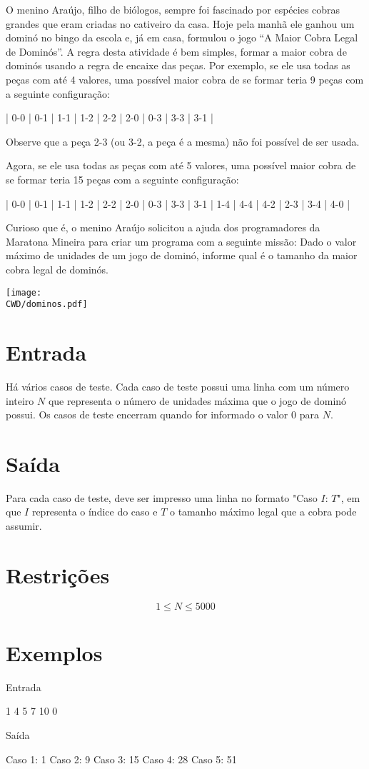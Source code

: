 O menino Araújo, filho de biólogos, sempre foi fascinado por espécies cobras grandes que eram criadas no cativeiro da casa. Hoje pela manhã ele ganhou um dominó no bingo da escola e, já em casa, formulou o jogo ``A Maior Cobra Legal de Dominós''. A regra desta atividade é bem simples, formar a maior cobra de dominós usando a regra de encaixe das peças. Por exemplo, se ele usa todas as peças com até 4 valores, uma possível maior cobra de se formar teria 9 peças com a seguinte configuração:

\begin{center}
  | 0-0 | 0-1 | 1-1 | 1-2 | 2-2 | 2-0 | 0-3 | 3-3 | 3-1 |
\end{center}

Observe que a peça 2-3 (ou 3-2, a peça é a mesma) não foi possível de ser usada.

Agora, se ele usa todas as peças com até 5 valores, uma possível maior cobra de se formar teria 15 peças com a seguinte configuração:

\begin{center}
  | 0-0 | 0-1 | 1-1 | 1-2 | 2-2 | 2-0 | 0-3 | 3-3 | 3-1 | 1-4 | 4-4 | 4-2 | 2-3 | 3-4 | 4-0 |
\end{center}

Curioso que é, o menino Araújo solicitou a ajuda dos programadores da Maratona Mineira para criar um programa com a seguinte missão: Dado o valor máximo de unidades de um jogo de dominó, informe qual é o tamanho da maior cobra legal de dominós.

\begin{center}
  \texttt{[image: \\CWD/dominos.pdf]}
\end{center}


\section*{Entrada}

Há vários casos de teste. Cada caso de teste possui uma linha com um número inteiro $N$ que representa o número de unidades máxima que o jogo de dominó possui. Os casos de teste encerram quando for informado o valor $0$ para $N$.

\section*{Saída}

Para cada caso de teste, deve ser impresso uma linha no formato "Caso $I$: $T$", em que $I$ representa o índice do caso e $T$ o tamanho máximo legal que a cobra pode assumir.

\section*{Restrições}

$$1 \leq N \leq 5000$$

\section*{Exemplos}

Entrada

1
4
5
7
10
0

Saída

Caso 1: 1
Caso 2: 9
Caso 3: 15
Caso 4: 28
Caso 5: 51

\exemplo

